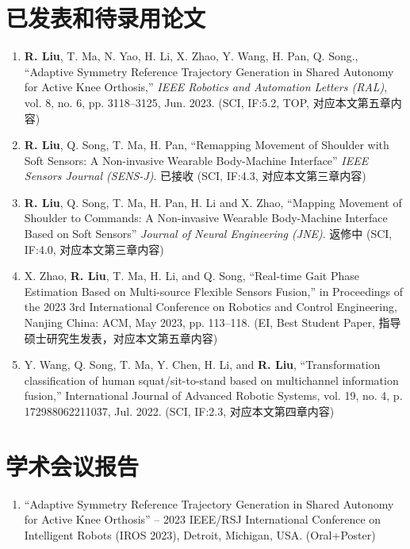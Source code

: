 
\begin{publications}

\section*{已发表和待录用论文}

\begin{enumerate}
\item \textbf{R. Liu}, T. Ma, N. Yao, H. Li, X. Zhao, Y. Wang, H. Pan, Q. Song., “Adaptive Symmetry Reference Trajectory Generation in Shared Autonomy for Active Knee Orthosis,” \textit{IEEE Robotics and Automation Letters (RAL)}, vol. 8, no. 6, pp. 3118–3125, Jun. 2023. (SCI, IF:5.2, TOP, 对应本文第五章内容)
\item \textbf{R. Liu}, Q. Song, T. Ma, H. Pan, ``Remapping Movement of Shoulder with Soft Sensors: A Non-invasive Wearable Body-Machine Interface'' \textit{IEEE Sensors Journal (SENS-J)}. 已接收 (SCI, IF:4.3, 对应本文第三章内容)
\item \textbf{R. Liu}, Q. Song, T. Ma, H. Pan, H. Li and X. Zhao, ``Mapping Movement of Shoulder to Commands: A Non-invasive Wearable Body-Machine Interface Based on Soft Sensors'' \textit{Journal of Neural Engineering (JNE)}. 返修中 (SCI, IF:4.0, 对应本文第三章内容)
\item X. Zhao, \textbf{R. Liu}, T. Ma, H. Li, and Q. Song, “Real-time Gait Phase Estimation Based on Multi-source Flexible Sensors Fusion,” in Proceedings of the 2023 3rd International Conference on Robotics and Control Engineering, Nanjing China: ACM, May 2023, pp. 113–118. (EI, Best Student Paper, 指导硕士研究生发表，对应本文第五章内容)
\item Y. Wang, Q. Song, T. Ma, Y. Chen, H. Li, and \textbf{R. Liu}, “Transformation classification of human squat/sit-to-stand based on multichannel information fusion,” International Journal of Advanced Robotic Systems, vol. 19, no. 4, p. 172988062211037, Jul. 2022. (SCI, IF:2.3, 对应本文第四章内容)
\end{enumerate}

\section*{学术会议报告}
\begin{enumerate}
\item ``Adaptive Symmetry Reference Trajectory Generation in Shared Autonomy for Active Knee Orthosis'' – 2023 IEEE/RSJ International Conference on Intelligent Robots (IROS 2023), Detroit, Michigan, USA. (Oral+Poster)
\end{enumerate}


\end{publications}
